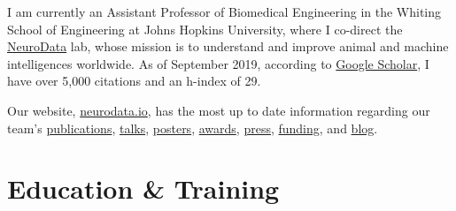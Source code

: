 \documentclass[10pt,colorlinks=true,urlcolor=blue]{moderncv}
\begin{document}
\maketitle

I am currently an Assistant Professor of Biomedical Engineering in the Whiting School of Engineering at Johns Hopkins University, where I co-direct the \href{https://neurodata.io/}{NeuroData} lab, whose mission is to understand and improve animal and machine intelligences worldwide. As of September 2019, according to \href{https://scholar.google.com/citations?user=DWPfdT4AAAAJ&hl=en&oi=ao}{Google Scholar}, I have over 5,000 citations and an h-index of 29.  

\vspace{10pt}

Our website, \href{https://neurodata.io}{neurodata.io},  has the most up to date information regarding our team's
% 
	  \href{https://neurodata.io/publications/}{publications},
	  \href{https://neurodata.io/talks/}{talks},
	  \href{https://neurodata.io/presentations/#posters}{posters},
	  \href{https://neurodata.io/awards}{awards},
	  \href{https://neurodata.io/press}{press},
	  \href{https://github.com/jovo/cv/raw/master/CP_Vogelstein.pdf}{funding}, and
	  \href{https://blog.neurodata.io/}{blog}.

\section{Education \& Training}



\end{document}
